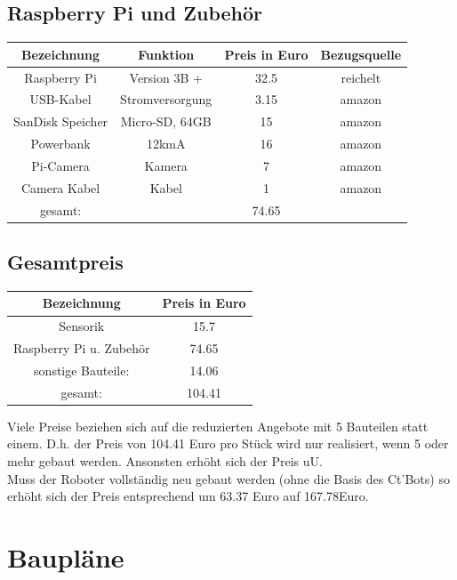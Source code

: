 \documentclass[twoside,11pt, a4paper]{report}
\begin{document}
		\section{Raspberry Pi und Zubehör}
	\begin{center}
		\begin{tabular}{|c|c|c|c|}
			\hline
			Bezeichnung			&Funktion				& Preis	in Euro			&Bezugsquelle\\
			\hline
			Raspberry Pi 		& Version 3B +			& 32.5			& reichelt		\\
			USB-Kabel			& Stromversorgung		& 3.15			& amazon		\\
			SanDisk Speicher	& Micro-SD, 64GB		& 15			& amazon \\
			Powerbank			& 12kmA					& 16			& amazon \\
			Pi-Camera			&Kamera					& 7				& amazon		\\
			Camera Kabel		&Kabel					& 1				& amazon		\\
			\hline
			gesamt:			&						& 74.65				&\\
			\hline
		\end{tabular}
	\end{center}

	\section{Gesamtpreis}
	\begin{center}
		\begin{tabular}{|c|c|}
			\hline
			Bezeichnung				& Preis	in Euro	\\
			\hline
			Sensorik				& 15.7\\
			Raspberry Pi u. Zubehör	& 74.65\\
			sonstige Bauteile:		& 14.06\\
			\hline
			gesamt:				& 104.41\\
			\hline
		\end{tabular}
	\end{center}
	Viele Preise beziehen sich auf die reduzierten Angebote mit 5 Bauteilen statt einem. D.h. der Preis von 104.41 Euro pro Stück wird nur realisiert, wenn 5 oder mehr gebaut werden. Ansonsten erhöht sich der Preis uU. \\
	Muss der Roboter vollständig neu gebaut werden (ohne die Basis des Ct'Bots) so erhöht sich der Preis entsprechend um 63.37 Euro auf 167.78Euro. 
	
	\chapter{Baupläne}
\end{document}
